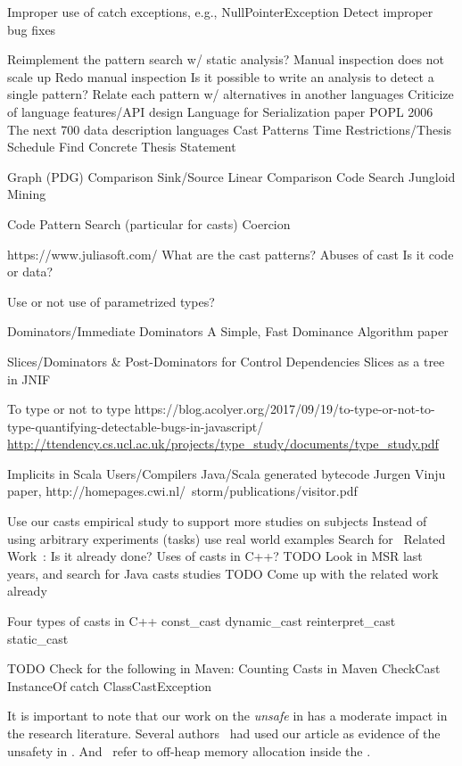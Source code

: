Improper use of catch exceptions, e.g., NullPointerException
Detect improper bug fixes


Reimplement the pattern search w/ static analysis?
Manual inspection does not scale up
Redo manual inspection
Is it possible to write an analysis to detect a single pattern?
Relate each pattern w/ alternatives in another languages
Criticize of language features/API design
Language for Serialization paper POPL 2006
The next 700 data description languages
Cast Patterns
Time Restrictions/Thesis Schedule
Find Concrete Thesis Statement


Graph (PDG) Comparison
Sink/Source
Linear Comparison
Code Search
Jungloid Mining

Code Pattern Search (particular for casts)
Coercion

https://www.juliasoft.com/
What are the cast patterns?
Abuses of cast
Is it code or data?

Use or not use of parametrized types?

Dominators/Immediate Dominators
A Simple, Fast Dominance Algorithm paper



Slices/Dominators \& Post-Dominators for Control Dependencies
Slices as a tree in JNIF

To type or not to type
https://blog.acolyer.org/2017/09/19/to-type-or-not-to-type-quantifying-detectable-bugs-in-javascript/
\url{http://ttendency.cs.ucl.ac.uk/projects/type_study/documents/type_study.pdf}

Implicits in Scala
Users/Compilers Java/Scala generated bytecode
Jurgen Vinju paper, http://homepages.cwi.nl/~storm/publications/visitor.pdf

Use our casts empirical study to support more studies on subjects
Instead of using arbitrary experiments (tasks) use real world examples
Search for ~Related Work~: Is it already done?
Uses of casts in C++?
TODO Look in MSR last years, and search for Java casts studies
TODO Come up with the related work already

Four types of casts in C++
const\_cast
dynamic\_cast
reinterpret\_cast
static\_cast

TODO Check for the following in Maven:
Counting Casts in Maven
CheckCast
InstanceOf
catch ClassCastException


It is important to note that our work on the \emph{unsafe} \api{} in \java{} has a moderate impact in the research literature.
Several authors~
\cite{staicu_understanding_2017,jiang_unsupervised_2017,zhang_accepting_2016,saied_cooperative_2016,hora_when_2016,li_accessing_2016,holzinger_-depth_2016} had used our article as evidence of the unsafety in \java{}.
And~\cite{bruno_ng2c:_2017} refer to off-heap memory allocation inside the \jvm{}.

